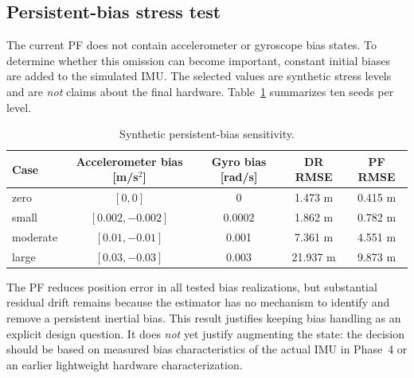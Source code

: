 \subsection{Persistent-bias stress test}
The current PF does not contain accelerometer or gyroscope bias states. To determine whether this omission can become important, constant initial biases are added to the simulated IMU. The selected values are synthetic stress levels and are \emph{not} claims about the final hardware. Table~\ref{tab:p1b_bias} summarizes ten seeds per level.
\begin{table}[ht]
\centering
\caption{Synthetic persistent-bias sensitivity.}
\label{tab:p1b_bias}
\begin{tabular}{lcccc}
\toprule
Case & Accelerometer bias [m/s$^2$] & Gyro bias [rad/s] & DR RMSE & PF RMSE\\
\midrule
zero & $[0,0]$ & 0 & 1.473 m & 0.415 m\\
small & $[0.002,-0.002]$ & 0.0002 & 1.862 m & 0.782 m\\
moderate & $[0.01,-0.01]$ & 0.001 & 7.361 m & 4.551 m\\
large & $[0.03,-0.03]$ & 0.003 & 21.937 m & 9.873 m\\
\bottomrule
\end{tabular}
\end{table}
The PF reduces position error in all tested bias realizations, but substantial residual drift remains because the estimator has no mechanism to identify and remove a persistent inertial bias. This result justifies keeping bias handling as an explicit design question. It does \emph{not} yet justify augmenting the state: the decision should be based on measured bias characteristics of the actual IMU in Phase~4 or an earlier lightweight hardware characterization.


